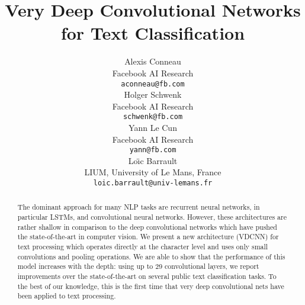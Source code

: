 \documentclass[a4paper,11pt]{article}
\title{Very Deep Convolutional Networks \\ for Text Classification}
\author{
Alexis Conneau \\
Facebook AI Research \\
\texttt{aconneau@fb.com} \\
\And
Holger Schwenk \\
Facebook AI Research \\
\texttt{schwenk@fb.com} \\
\And
Yann Le Cun \\
Facebook AI Research \\
\texttt{yann@fb.com} \\
\AND
Lo\"{\i}c Barrault \\
LIUM, University of Le Mans, France \\
\texttt{loic.barrault@univ-lemans.fr} \\
}
\date{}
\begin{document}
\maketitle
\begin{abstract}
The dominant approach for many NLP tasks are recurrent neural networks, in
particular LSTMs, and convolutional neural networks. However, these
architectures are rather shallow in comparison to the deep convolutional
networks which have pushed the state-of-the-art in computer vision.  We present a new
architecture (VDCNN) for text processing which operates directly at the character level
and uses only small convolutions and pooling operations.
We are able to show that the performance of this model increases with the
depth: using up to 29 convolutional layers, we report improvements
over the state-of-the-art on several public text classification tasks.  To the
best of our knowledge, this is the first time that very deep convolutional nets
have been applied to text processing.
\end{abstract}
\end{document}
